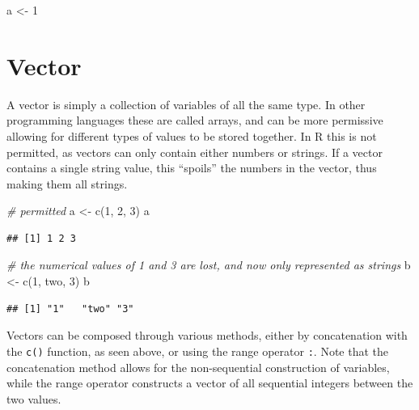 \documentclass[
]{book}
\newenvironment{Shaded}{\begin{snugshade}}{\end{snugshade}}
\newcommand{\CommentTok}[1]{\textcolor[rgb]{0.56,0.35,0.01}{\textit{#1}}}
\newcommand{\DecValTok}[1]{\textcolor[rgb]{0.00,0.00,0.81}{#1}}
\newcommand{\FunctionTok}[1]{\textcolor[rgb]{0.00,0.00,0.00}{#1}}
\newcommand{\NormalTok}[1]{#1}
\newcommand{\OtherTok}[1]{\textcolor[rgb]{0.56,0.35,0.01}{#1}}
\newcommand{\StringTok}[1]{\textcolor[rgb]{0.31,0.60,0.02}{#1}}
\begin{document}
\begin{Shaded}
\begin{Highlighting}[]
\NormalTok{a }\OtherTok{\textless{}{-}} \DecValTok{1}
\end{Highlighting}
\end{Shaded}

\hypertarget{vector}{%
\section{Vector}\label{vector}}

A vector is simply a collection of variables of all the same type. In other programming languages these are called arrays, and can be more permissive allowing for different types of values to be stored together. In R this is not permitted, as vectors can only contain either numbers or strings. If a vector contains a single string value, this ``spoils'' the numbers in the vector, thus making them all strings.

\begin{Shaded}
\begin{Highlighting}[]
\CommentTok{\# permitted}
\NormalTok{a }\OtherTok{\textless{}{-}} \FunctionTok{c}\NormalTok{(}\DecValTok{1}\NormalTok{, }\DecValTok{2}\NormalTok{, }\DecValTok{3}\NormalTok{)}
\NormalTok{a}
\end{Highlighting}
\end{Shaded}

\begin{verbatim}
## [1] 1 2 3
\end{verbatim}

\begin{Shaded}
\begin{Highlighting}[]
\CommentTok{\# the numerical values of 1 and 3 are lost, and now only represented as strings}
\NormalTok{b }\OtherTok{\textless{}{-}} \FunctionTok{c}\NormalTok{(}\DecValTok{1}\NormalTok{, }\StringTok{\textquotesingle{}two\textquotesingle{}}\NormalTok{, }\DecValTok{3}\NormalTok{)}
\NormalTok{b}
\end{Highlighting}
\end{Shaded}

\begin{verbatim}
## [1] "1"   "two" "3"
\end{verbatim}

Vectors can be composed through various methods, either by concatenation with the \texttt{c()} function, as seen above, or using the range operator \texttt{:}. Note that the concatenation method allows for the non-sequential construction of variables, while the range operator constructs a vector of all sequential integers between the two values.
\end{document}
